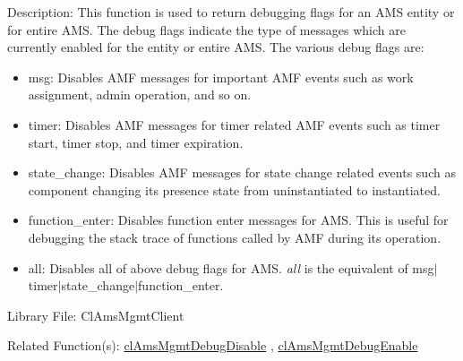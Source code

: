 \begin{Desc}
\item[Description:]This function is used to return debugging flags for an AMS entity or for entire AMS. The debug flags indicate the type of messages which are currently enabled for the entity or entire AMS. The various debug flags are: \begin{itemize}
\item msg: Disables AMF messages for important AMF events such as work assignment, admin operation, and so on. \item timer: Disables AMF messages for timer related AMF events such as timer start, timer stop, and timer expiration. \item state\_\-change: Disables AMF messages for state change related events such as component changing its presence state from uninstantiated to instantiated. \item function\_\-enter: Disables function enter messages for AMS. This is useful for debugging the stack trace of functions called by AMF during its operation. \item all: Disables all of above debug flags for AMS. {\em all\/} is the equivalent of msg$|$timer$|$state\_\-change$|$function\_\-enter.\end{itemize}
\end{Desc}
\begin{Desc}
\item[Library File:]Cl\-Ams\-Mgmt\-Client\end{Desc}
\begin{Desc}
\item[Related Function(s):]\hyperlink{pageams126}{cl\-Ams\-Mgmt\-Debug\-Disable} , \hyperlink{pageams125}{cl\-Ams\-Mgmt\-Debug\-Enable} \end{Desc}



 \newpage
